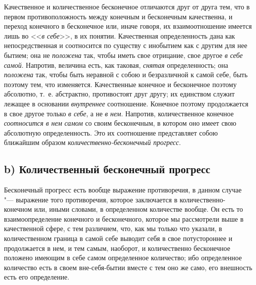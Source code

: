 Качественное и количественное бесконечное отличаются друг от друга тем, что
в первом противоположность между конечным и бесконечным качественна, и
переход конечного в бесконечное или, иначе говоря, их взаимоотношение
имеется лишь во <<{\em в себе}>>, в их понятии.
Качественная определенность дана как непосредственная и соотносится по
существу с инобытием как с другим для нее бытием; она не
{\em положена} так, чтобы иметь свое отрицание, свое
другое {\em в себе самой}. Напротив, величина есть, как
таковая, {\em снятая} определенность; она
{\em положена} так, чтобы быть неравной с собою и
безразличной к самой себе, быть поэтому тем, что изменяется. Качественные
конечное и бесконечное поэтому абсолютно, т.~е. абстрактно, противостоят
друг другу; их единством служит лежащее в основании
{\em внутреннее} соотношение. Конечное поэтому
продолжается в свое другое только {\em в себе}, а не
{\em в нем}. Напротив, количественное конечное
{\em соотносится в нем самом} со своим бесконечным, в
котором оно имеет свою абсолютную определенность. Это их соотношение
представляет собою ближайшим образом
{\em количественно-бесконечный прогресс}.


\subsection[b) Количественный бесконечный прогресс]{b) Количественный бесконечный прогресс}

Бесконечный прогресс есть вообще выражение противоречия, в данном случае
"--- выражение того противоречия, которое заключается в количественно-конечном
или, иными словами, в определенном количестве вообще. Он есть то
взаимоопределение конечного и бесконечного, которое мы рассмотрели выше в
качественной сфере, с тем различием, что, как мы только что указали, в
количественном граница в самой себе выводит себя в свое потустороннее и
продолжается в нем, и тем самым, наоборот, и количественно бесконечное
положено имеющим в себе самом определенное количество; ибо определенное
количество есть в своем вне-себя-бытии вместе с тем оно же само, его
внешность есть его определение.

